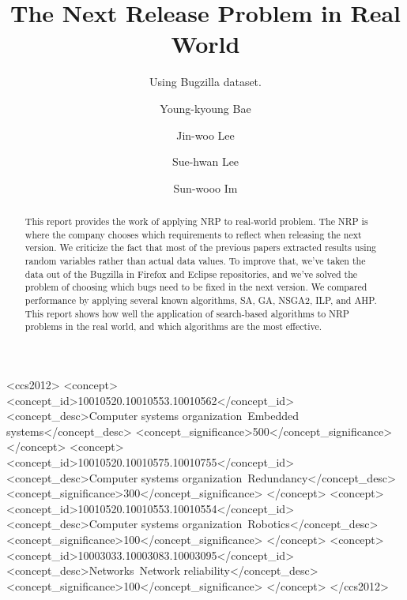 \documentclass[sigconf]{acmart}
\begin{document}
\title{The Next Release Problem in Real World}
\subtitle{Using Bugzilla dataset.}


\author{Young-kyoung Bae}


\author{Jin-woo Lee}

\author{Sue-hwan Lee}
\author{Sun-wooo Im}



\begin{abstract}
This report provides the work of applying NRP to real-world problem. The NRP is where the company chooses which requirements to reflect when releasing the next version. We criticize the fact that most of the previous papers extracted results using random variables rather than actual data values. To improve that, we've taken the data out of the Bugzilla in Firefox and Eclipse repositories, and we've solved the problem of choosing which bugs need to be fixed in the next version. We compared performance by applying several known algorithms, SA, GA, NSGA2, ILP, and AHP. This report shows how well the application of search-based algorithms to NRP problems in the real world, and which algorithms are the most effective.
\end{abstract}

%
%
\begin{CCSXML}
<ccs2012>
 <concept>
  <concept_id>10010520.10010553.10010562</concept_id>
  <concept_desc>Computer systems organization~Embedded systems</concept_desc>
  <concept_significance>500</concept_significance>
 </concept>
 <concept>
  <concept_id>10010520.10010575.10010755</concept_id>
  <concept_desc>Computer systems organization~Redundancy</concept_desc>
  <concept_significance>300</concept_significance>
 </concept>
 <concept>
  <concept_id>10010520.10010553.10010554</concept_id>
  <concept_desc>Computer systems organization~Robotics</concept_desc>
  <concept_significance>100</concept_significance>
 </concept>
 <concept>
  <concept_id>10003033.10003083.10003095</concept_id>
  <concept_desc>Networks~Network reliability</concept_desc>
  <concept_significance>100</concept_significance>
 </concept>
</ccs2012>
\end{CCSXML}


\maketitle





\end{document}
